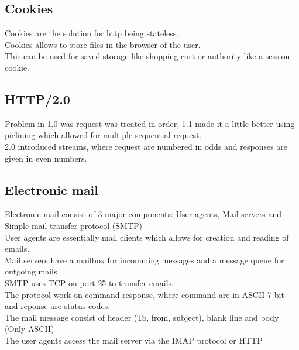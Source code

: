 \documentclass[12pt, a4paper]{article}
\begin{document}
		\subsection{Cookies}
			Cookies are the solution for http being stateless.\\
			Cookies allows to store files in the browser of the user.\\
			This can be used for saved storage like shopping cart or authority like a session cookie.\\
		\subsection{HTTP/2.0}
			Problem in 1.0 was request was treated in order, 1.1 made it a little better using pielining which allowed for multiple sequential request.\\
			2.0 introduced streams, where request are numbered in odds and responses are given in even numbers.\\
		\subsection{Electronic mail}
			Electronic mail consist of 3 major components: User agents, Mail servers and Simple mail transfer protocol (SMTP)\\
			User agents are essentially mail clients which allows for creation and reading of emails.\\
			Mail servers have a mailbox for incomming messages and a message queue for outgoing mails\\
			SMTP uses TCP on port 25 to transfer emails.\\
			The protocol work on command response, where command are in ASCII 7 bit and reponse are status codes.\\
			The mail message consist of header (To, from, subject), blank line and body (Only ASCII)\\
			The user agents access the mail server via the IMAP protocol or HTTP\\
\end{document}
